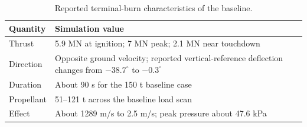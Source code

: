 \begin{table}[htbp]
\caption{Reported terminal-burn characteristics of the baseline.}
\label{tab:src8}
\small
\setlength{\tabcolsep}{3.5pt}
\begin{tabularx}{\linewidth}{@{}p{.22\linewidth}X@{}}
\toprule
Quantity & Simulation value \\
\midrule
Thrust & 5.9 MN at ignition; 7 MN peak; 2.1 MN near touchdown \\
Direction & Opposite ground velocity; reported vertical-reference deflection changes from $-38.7^\circ$ to $-0.3^\circ$ \\
Duration & About 90 s for the 150 t baseline case \\
Propellant & 51--121 t across the baseline load scan \\
Effect & About 1289 m/s to 2.5 m/s; peak pressure about 47.6 kPa \\
\bottomrule
\end{tabularx}
\end{table}

